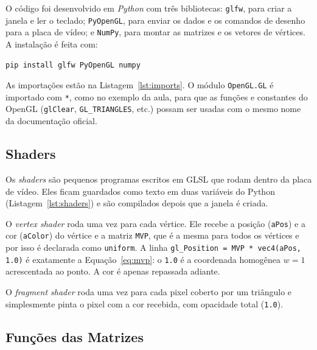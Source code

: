 \documentclass{article}
\begin{document}
O código foi desenvolvido em \textit{Python} com três bibliotecas: \texttt{glfw}, para criar a janela e ler o teclado; \texttt{PyOpenGL}, para enviar os dados e os comandos de desenho para a placa de vídeo; e \texttt{NumPy}, para montar as matrizes e os vetores de vértices. A instalação é feita com:

\begin{lstlisting}[style=pythonstyle, numbers=none]
pip install glfw PyOpenGL numpy
\end{lstlisting}

As importações estão na Listagem~\ref{lst:imports}. O módulo \texttt{OpenGL.GL} é importado com \texttt{*}, como no exemplo da aula, para que as funções e constantes do OpenGL (\texttt{glClear}, \texttt{GL\_TRIANGLES}, etc.) possam ser usadas com o mesmo nome da documentação oficial.



\subsection{Shaders}

Os \textit{shaders} são pequenos programas escritos em GLSL que rodam dentro da placa de vídeo. Eles ficam guardados como texto em duas variáveis do Python (Listagem~\ref{lst:shaders}) e são compilados depois que a janela é criada.

O \textit{vertex shader} roda uma vez para cada vértice. Ele recebe a posição (\texttt{aPos}) e a cor (\texttt{aColor}) do vértice e a matriz \texttt{MVP}, que é a mesma para todos os vértices e por isso é declarada como \texttt{uniform}. A linha \texttt{gl\_Position = MVP * vec4(aPos, 1.0)} é exatamente a Equação~\ref{eq:mvp}: o \texttt{1.0} é a coordenada homogênea $w = 1$ acrescentada ao ponto. A cor é apenas repassada adiante.

O \textit{fragment shader} roda uma vez para cada pixel coberto por um triângulo e simplesmente pinta o pixel com a cor recebida, com opacidade total (\texttt{1.0}).



\subsection{Funções das Matrizes}
\end{document}
